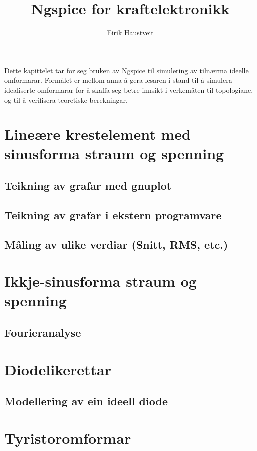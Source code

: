 \documentclass[10pt,a4paper]{article}
\title{Ngspice for kraftelektronikk}
\author{Eirik Haustveit}
\begin{document}
	\maketitle
	
	
	Dette kapittelet tar for seg bruken av Ngspice til simulering av tilnærma ideelle omformarar. Formålet er mellom anna å gera lesaren i stand til å simulera idealiserte omformarar for å skaffa seg betre innsikt i verkemåten til topologiane, og til å verifisera teoretiske berekningar.
	
	
	\section{Lineære krestelement med sinusforma straum og spenning}
	
	
	\subsection{Teikning av grafar med gnuplot}
	
	\subsection{Teikning av grafar i ekstern programvare}
	
	
	\subsection{Måling av ulike verdiar (Snitt, RMS, etc.)}
	
	
	\section{Ikkje-sinusforma straum og spenning}
	
	
	\subsection{Fourieranalyse}

	
	\section{Diodelikerettar}
	
	
	\subsection{Modellering av ein ideell diode}
	
	
	
	\section{Tyristoromformar}
	
\end{document}
